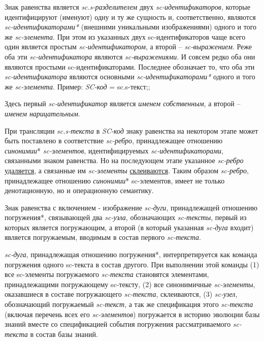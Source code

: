 Знак равенства является \textit{sc.s-разделителем} двух \textit{sc-идентификаторов}, которые идентифицируют (именуют) одну и ту же сущность и, соответственно, являются \textit{sc-идентификаторами*} (внешними уникальными изображениями) одного и того же \textit{sc-элемента}. При этом из указанных двух sc-идентификаторов чаще всего один является простым \textit{sc-идентификатором}, а второй – \textit{sc-выражением}. Реже оба эти \textit{sc-идентификатора} являются \textit{sc-выражениями}. И совсем редко оба они являются простыми sc-идентификаторами. Последнее обозначает то, что оба эти \textit{sc-идентификатора} являются основными \textit{sc-идентификаторами*} одного и того же \textit{sc-элемента}. Пример:
\textit{SC-код} = sc.s-текст;;


Здесь первый \textit{sc-идентификатор} является \textit{именем собственным}, а второй -- \textit{именем нарицательным}.

При трансляции \textit{sc.s-текста} в \textit{SC-код} знаку равенства на некотором этапе может быть поставлено в соответствие \textit{sc-ребро}, принадлежащее отношению \textit{синонимии}* \textit{sc-элементов}, идентифицируемых \mbox{\textit{sc-идентификаторами}}, связанными знаком равенства. Но на последующем этапе указанное \textit{sc-ребро} \uline{удаляется}, а связанные им \textit{sc-элементы} \uline{склеиваются}. Таким образом \textit{sc-ребро}, принадлежащее отношению \textit{синонимии}* sc-элементов, имеет не только денотационную, но и операционную семантику.

Знак равенства с включением - изображение \textit{sc-дуги}, принадлежащей отношению погружения*, связывающей два \textit{sc-узла}, обозначающих \textit{sc-тексты}, первый из которых является погружающим, а второй (в который указанная \textit{sc-дуга} входит) является погружаемым, вводимым в состав первого \textit{sc-текста}. 

\textit{sc-дуга}, принадлежащая отношению погружения*, интерпретируется как команда погружения одного sc-текста в состав другого. При выполнении этой команды (1) все sc-элементы погружаемого \textit{sc-текста} становятся элементами, принадлежащими погружающему sc-тексту, (2) все синонимичные \textit{sc-элементы}, оказавшиеся в составе погружающего \textit{sc-текста}, склеиваются, (3) \textit{sc-узел}, обозначающий погружаемый \textit{sc-текст}, а так же спецификация этого \textit{sc-текста} (включая перечень всех его \textit{sc-элементов}) погружается в историю эволюции базы знаний вместе со спецификацией события погружения рассматриваемого \textit{sc-текста} в состав базы знаний.

